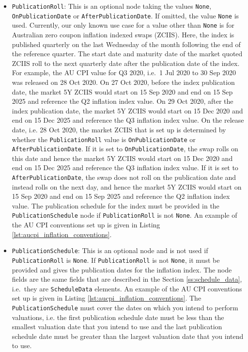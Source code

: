 \begin{itemize}
\item \lstinline!PublicationRoll!:
This is an optional node taking the values \lstinline!None!, \lstinline!OnPublicationDate! or \lstinline!AfterPublicationDate!. If omitted, the value \lstinline!None! is used. Currently, our only known use case for a value other than \lstinline!None! is for Australian zero coupon inflation indexed swaps (ZCIIS). Here, the index is published quarterly on the last Wednesday of the month following the end of the reference quarter. The start date and maturity date of the market quoted ZCIIS roll to the next quarterly date after the publication date of the index. For example, the AU CPI value for Q3 2020, i.e.\ 1 Jul 2020 to 30 Sep 2020 was released on 28 Oct 2020. On 27 Oct 2020, before the index publication date, the market 5Y ZCIIS would start on 15 Sep 2020 and end on 15 Sep 2025 and reference the Q2 inflation index value. On 29 Oct 2020, after the index publication date, the market 5Y ZCIIS would start on 15 Dec 2020 and end on 15 Dec 2025 and reference the Q3 inflation index value. On the release date, i.e. 28 Oct 2020, the market ZCIIS that is set up is determined by whether the \lstinline!PublicationRoll! value is \lstinline!OnPublicationDate! or \lstinline!AfterPublicationDate!. If it is set to \lstinline!OnPublicationDate!, the swap rolls on this date and hence the market 5Y ZCIIS would start on 15 Dec 2020 and end on 15 Dec 2025 and reference the Q3 inflation index value. If it is set to \lstinline!AfterPublicationDate!, the swap does not roll on the publication date and instead rolls on the next day, and hence the market 5Y ZCIIS would start on 15 Sep 2020 and end on 15 Sep 2025 and reference the Q2 inflation index value. The publication schedule for the index must be provided in the \lstinline!PublicationSchedule! node if \lstinline!PublicationRoll! is not \lstinline!None!. An example of the AU CPI conventions set up is given in Listing \ref{lst:aucpi_inflation_conventions}.

\item \lstinline!PublicationSchedule!:
This is an optional node and is not used if \lstinline!PublicationRoll! is \lstinline!None!. If \lstinline!PublicationRoll! is not \lstinline!None!, it must be provided and gives the publication dates for the inflation index. The node fields are the same fields that are described in the Section \ref{ss:schedule_data}, i.e.\ they are \lstinline!ScheduleData! elements. An example of the AU CPI conventions set up is given in Listing \ref{lst:aucpi_inflation_conventions}. The \lstinline!PublicationSchedule! must cover the dates on which you intend to perform valuations, i.e. the first publication schedule date must be less than the smallest valuation date that you intend to use and the last publication schedule date must be greater than the largest valuation date that you intend to use.

\end{itemize}

